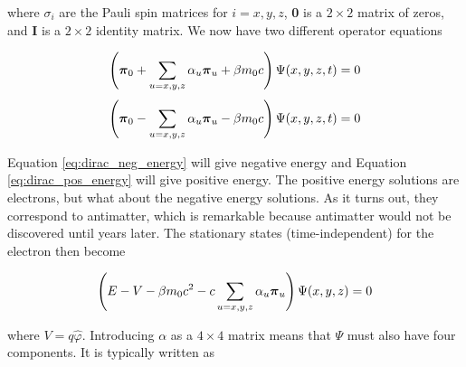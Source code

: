 \documentclass[12pt]{report}
\begin{document}
where $\sigma_{i}$ are the Pauli spin matrices for $i=x,y,z$, \textbf{0} is a $2\times2$ matrix of zeros, and \textbf{I} is a $2\times2$ identity matrix\cite{Piela}. We now have two different operator equations

\begin{equation}
\label{eq:dirac_neg_energy}
\left({\bf{\pi}}_{0} + \sum_{u=x,y,z}\alpha_{u}{\bf{\pi}}_{u} + \beta{}m_{0}c\right)\Psi(x, y, z, t) = 0
\end{equation}
\begin{equation}
\label{eq:dirac_pos_energy}
\left({\bf{\pi}}_{0} - \sum_{u=x,y,z}\alpha_{u}{\bf{\pi}}_{u} - \beta{}m_{0}c\right)\Psi(x, y, z, t) = 0
\end{equation}

Equation \ref{eq:dirac_neg_energy} will give negative energy and Equation \ref{eq:dirac_pos_energy} will give positive energy. The positive energy solutions are electrons, but what about the negative energy solutions. As it turns out, they correspond to antimatter, which is remarkable because antimatter would not be discovered until years later\cite{PhysRev.43.491}. The stationary states (time-independent) for the electron then become

\begin{equation}
\label{eq:dirac_stat_state}
\left(E - V -\beta m_{0}c^{2} - c\sum_{u=x,y,z}\alpha_{u}{\bf{\pi}}_{u}\right)\Psi(x, y, z) = 0
\end{equation}

where $V = q\hat{\varphi}$. Introducing $\alpha$ as a $4\times4$ matrix means that $\Psi$ must also have four components. It is typically written as
\end{document}
